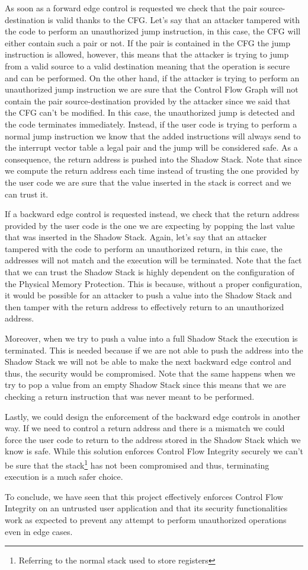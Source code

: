 As soon as a forward edge control is requested we check that the pair source-destination
is valid thanks to the CFG. Let's say that an attacker tampered with the code to
perform an unauthorized jump instruction, in this case, the CFG will either contain
such a pair or not. If the pair is contained in the CFG the jump instruction is
allowed, however, this means that the attacker is trying to jump from a valid
source to a valid destination meaning that the operation is secure and can be
performed. On the other hand, if the attacker is trying to perform an
unauthorized jump instruction we are sure that the Control Flow Graph will not
contain the pair source-destination provided by the attacker since we said that
the CFG can't be modified. In this case, the unauthorized jump is detected and
the code terminates immediately. Instead, if the user code is trying to perform
a normal jump instruction we know that the added instructions will always send
to the interrupt vector table a legal pair and the jump will be considered safe.
As a consequence, the return address is pushed into the Shadow Stack. Note that since
we compute the return address each time instead of trusting the one provided by the
user code we are sure that the value inserted in the stack is correct and we can
trust it.

If a backward edge control is requested instead, we check that the return
address provided by the user code is the one we are expecting by popping the
last value that was inserted in the Shadow Stack. Again, let's say that an
attacker tampered with the code to perform an unauthorized return, in this case,
the addresses will not match and the execution will be terminated. Note that the
fact that we can trust the Shadow Stack is highly dependent on the configuration
of the Physical Memory Protection. This is because, without a proper configuration,
it would be possible for an attacker to push a value into the Shadow Stack and
then tamper with the return address to effectively return to an unauthorized
address.

Moreover, when we try to push a value into a full Shadow Stack the execution is terminated.
This is needed because if we are not able to push the address into the Shadow
Stack we will not be able to make the next backward edge control and thus, the security
would be compromised. Note that the same happens when we try to pop a value from
an empty Shadow Stack since this means that we are checking a return instruction
that was never meant to be performed.

Lastly, we could design the enforcement of the backward edge controls in another
way. If we need to control a return address and there is a mismatch we could
force the user code to return to the address stored in the Shadow Stack which we
know is safe. While this solution enforces Control Flow Integrity securely we can't
be sure that the stack\footnote{Referring to the normal stack used to store
registers} has not been compromised and thus, terminating execution is a much safer
choice.

To conclude, we have seen that this project effectively enforces Control Flow
Integrity on an untrusted user application and that its security functionalities
work as expected to prevent any attempt to perform unauthorized operations even
in edge cases.
